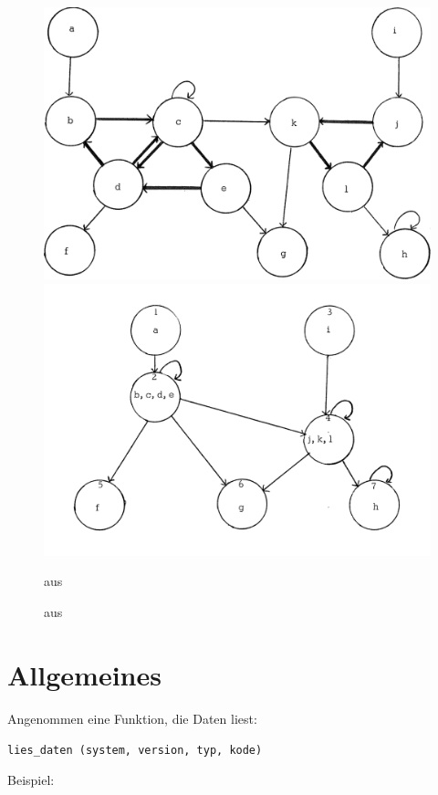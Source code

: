 \begin{figure}[H]
    \centering
    \includegraphics[width=.49\linewidth]{../img/purdom_g1.png}
    \includegraphics[width=.49\linewidth]{../img/purdom_g2b.png}
    \caption{aus \citep[Seite 78]{purdom1970transitive}}
\end{figure}

\newpage

\begin{figure}[H]
    \centering
    \setlength{\fboxsep}{10pt}\color{black!20}
    \normalcolor\caption{aus \citep[Seite 200]{jakobsson1991mixed}}
\end{figure}


\newpage

\section{Allgemeines}

Angenommen eine Funktion, die Daten liest:

\texttt{lies\_daten (system, version, typ, kode)}

Beispiel:


